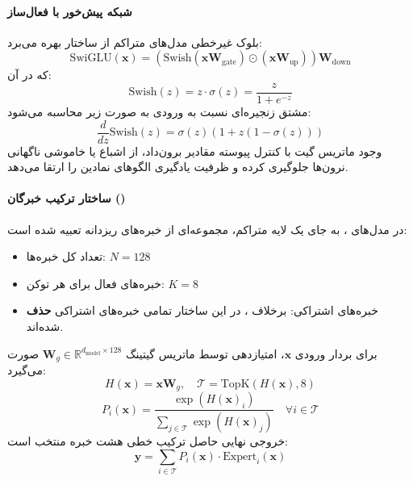 \paragraph*{شبکه پیش‌خور با فعال‌ساز }
بلوک غیرخطی مدل‌های متراکم از ساختار  \cite{dauphin2017language} بهره می‌برد:
\begin{equation}
    \text{SwiGLU}(\mathbf{x}) = \left( \text{Swish}(\mathbf{x} \mathbf{W}_{\text{gate}}) \odot (\mathbf{x} \mathbf{W}_{\text{up}}) \right) \mathbf{W}_{\text{down}}
\end{equation}
که در آن:
\begin{equation}
    \text{Swish}(z) = z \cdot \sigma(z) = \frac{z}{1 + e^{-z}}
\end{equation}
مشتق زنجیره‌ای نسبت به ورودی به صورت زیر محاسبه می‌شود:
\begin{equation}
    \frac{d}{dz}\text{Swish}(z) = \sigma(z) \left( 1 + z(1 - \sigma(z)) \right)
\end{equation}
وجود ماتریس گیت با کنترل پیوسته مقادیر برون‌داد، از اشباع یا خاموشی ناگهانی نرون‌ها جلوگیری کرده و ظرفیت یادگیری الگوهای نمادین را ارتقا می‌دهد.

\paragraph*{ساختار ترکیب خبرگان ()}
در مدل‌های  \cite{dai2024deepseekmoe}، به جای یک لایه متراکم، مجموعه‌ای از خبره‌های ریزدانه تعبیه شده است:
\begin{itemize}
    \item تعداد کل خبره‌ها: $N = 128$
    \item خبره‌های فعال برای هر توکن: $K = 8$
    \item خبره‌های اشتراکی: برخلاف ، در این ساختار تمامی خبره‌های اشتراکی \textbf{حذف} شده‌اند.
\end{itemize}
برای بردار ورودی $\mathbf{x}$، امتیازدهی توسط ماتریس گیتینگ $\mathbf{W}_g \in \mathbb{R}^{d_{\text{model}} \times 128}$ صورت می‌گیرد:
\begin{equation}
    H(\mathbf{x}) = \mathbf{x} \mathbf{W}_g, \quad \mathcal{T} = \text{TopK}\left(H(\mathbf{x}), 8\right)
\end{equation}
\begin{equation}
    P_i(\mathbf{x}) = \frac{\exp(H(\mathbf{x})_i)}{\sum_{j \in \mathcal{T}} \exp(H(\mathbf{x})_j)} \quad \forall i \in \mathcal{T}
\end{equation}
خروجی نهایی حاصل ترکیب خطی هشت خبره منتخب است:
\begin{equation}
    \mathbf{y} = \sum_{i \in \mathcal{T}} P_i(\mathbf{x}) \cdot \text{Expert}_i(\mathbf{x})
\end{equation}

